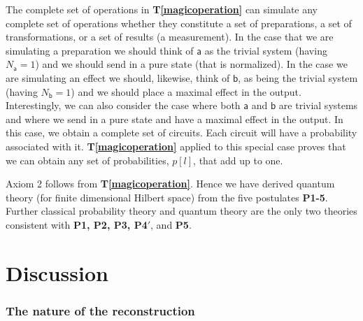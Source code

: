\documentclass[10pt]{article}
\begin{document}
The complete set of operations in {\bf T\ref{magicoperation}} can simulate any complete set of operations whether they constitute a set of preparations, a set of transformations, or a set of results (a measurement).  In the case that we are simulating a preparation we should think of $\mathsf a$ as the trivial system (having $N_\mathsf{a}=1$) and we should send in a pure state (that is normalized). In the case we are simulating an effect we should, likewise, think of $\mathsf b$, as being the trivial system (having $N_\mathsf{b}=1$) and we should place a maximal effect in the output.  Interestingly, we can also consider the case where both $\mathsf a$ and $\mathsf b$ are trivial systems and where we send in a pure state and have a maximal effect in the output.  In this case, we obtain a complete set of circuits.  Each circuit will have a probability associated with it.   {\bf T\ref{magicoperation}} applied to this special case proves that we can obtain any set of probabilities, $p[l]$, that add up to one.

Axiom 2 follows from {\bf T\ref{magicoperation}}.  Hence we have derived quantum theory (for finite dimensional Hilbert space) from the five postulates {\bf P1-5}.  Further classical probability theory and quantum theory are the only two theories consistent with {\bf P1, P2, P3, P4}$'$, and {\bf P5}.


\newpage

\part{Discussion}



\section{The nature of the reconstruction}
\end{document}
